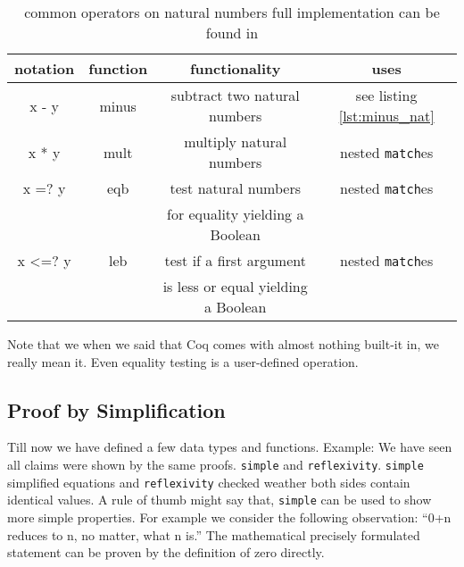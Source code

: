 	   \begin{table}   
	   \begin{tabular}{|c|c|c|c|}
	     \hline 
	 	  notation      & function        & functionality                       & uses           \\  \hline
	 	  x - y         & minus           & subtract two natural numbers        & see listing  \ref{lst:minus_nat} \\  \hline
	      x * y         & mult            & multiply natural numbers            & nested \lstinline!match!es \\  \hline   
	   	  x =? y        & eqb             & test natural numbers                & nested \lstinline!match!es \\  
	  	                &                 & for equality yielding a Boolean     &                \\  \hline
	   	  x <=? y       & leb             & test if a first argument            & nested \lstinline!match!es \\  
	   	                &                 & is less or equal yielding a Boolean &                \\  \hline
	   \end{tabular}
	   \caption{common operators on natural numbers full implementation can be found in \cite[section: Basics Functional Programming in Coq: Numbers]{PACGGHSY}}
	   \label{tab:operators}	   
	   \end{table}   
	   
		Note that we when we said that Coq comes with almost nothing built-it in, we really mean it.
	    Even equality testing is a user-defined operation.
	    
	   \subsection{Proof by Simplification}
	   
	   Till now we have defined a few data types and functions.
	   Example: We have seen all claims were shown by the same proofs. \lstinline!simple! and \lstinline!reflexivity!. 
	   \lstinline!simple! simplified equations and \lstinline!reflexivity! checked weather both sides contain identical values.
	   A rule of thumb might say that, \lstinline!simple! can be used to show more simple properties.
	   For example we consider the following observation: ``0+n reduces to n, no matter, what n is.''
	   The mathematical precisely formulated statement can be proven by the definition of zero directly.
	   
